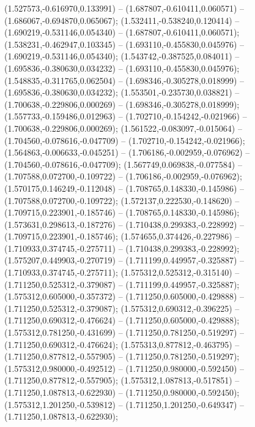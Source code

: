  (1.527573,-0.616970,0.133991) -- (1.687807,-0.610411,0.060571) -- (1.686067,-0.694870,0.065067);
 (1.532411,-0.538240,0.120414) -- (1.690219,-0.531146,0.054340) -- (1.687807,-0.610411,0.060571);
 (1.538231,-0.462947,0.103345) -- (1.693110,-0.455830,0.045976) -- (1.690219,-0.531146,0.054340);
 (1.543742,-0.387525,0.084011) -- (1.695836,-0.380630,0.034232) -- (1.693110,-0.455830,0.045976);
 (1.548835,-0.311765,0.062504) -- (1.698346,-0.305278,0.018999) -- (1.695836,-0.380630,0.034232);
 (1.553501,-0.235730,0.038821) -- (1.700638,-0.229806,0.000269) -- (1.698346,-0.305278,0.018999);
 (1.557733,-0.159486,0.012963) -- (1.702710,-0.154242,-0.021966) -- (1.700638,-0.229806,0.000269);
 (1.561522,-0.083097,-0.015064) -- (1.704560,-0.078616,-0.047709) -- (1.702710,-0.154242,-0.021966);
 (1.564863,-0.006633,-0.045251) -- (1.706186,-0.002959,-0.076962) -- (1.704560,-0.078616,-0.047709);
 (1.567749,0.069838,-0.077584) -- (1.707588,0.072700,-0.109722) -- (1.706186,-0.002959,-0.076962);
 (1.570175,0.146249,-0.112048) -- (1.708765,0.148330,-0.145986) -- (1.707588,0.072700,-0.109722);
 (1.572137,0.222530,-0.148620) -- (1.709715,0.223901,-0.185746) -- (1.708765,0.148330,-0.145986);
 (1.573631,0.298613,-0.187276) -- (1.710438,0.299383,-0.228992) -- (1.709715,0.223901,-0.185746);
 (1.574655,0.374426,-0.227986) -- (1.710933,0.374745,-0.275711) -- (1.710438,0.299383,-0.228992);
 (1.575207,0.449903,-0.270719) -- (1.711199,0.449957,-0.325887) -- (1.710933,0.374745,-0.275711);
 (1.575312,0.525312,-0.315140) -- (1.711250,0.525312,-0.379087) -- (1.711199,0.449957,-0.325887);
 (1.575312,0.605000,-0.357372) -- (1.711250,0.605000,-0.429888) -- (1.711250,0.525312,-0.379087);
 (1.575312,0.690312,-0.396225) -- (1.711250,0.690312,-0.476624) -- (1.711250,0.605000,-0.429888);
 (1.575312,0.781250,-0.431699) -- (1.711250,0.781250,-0.519297) -- (1.711250,0.690312,-0.476624);
 (1.575313,0.877812,-0.463795) -- (1.711250,0.877812,-0.557905) -- (1.711250,0.781250,-0.519297);
 (1.575312,0.980000,-0.492512) -- (1.711250,0.980000,-0.592450) -- (1.711250,0.877812,-0.557905);
 (1.575312,1.087813,-0.517851) -- (1.711250,1.087813,-0.622930) -- (1.711250,0.980000,-0.592450);
 (1.575312,1.201250,-0.539812) -- (1.711250,1.201250,-0.649347) -- (1.711250,1.087813,-0.622930);

